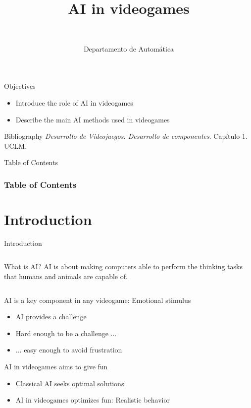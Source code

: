 \documentclass[10pt,compress]{beamer} %
\title[AI in videogames]{AI in videogames}
\author{\asignatura\\\carrera}
\institute{}
\date{Departamento de Automática}
\begin{document}
{\titlepageBlue
    \begin{frame}
        \titlepage
    \end{frame}
}

\begin{frame}[plain]{}
   \begin{block}{Objectives}
       \begin{itemize}
        \item Introduce the role of AI in videogames
        \item Describe the main AI methods used in videogames
       \end{itemize}
   \end{block}

   \begin{block}{Bibliography}
       \textit{Desarrollo de Videojuegos. Desarrollo de componentes}. Capítulo 1. UCLM.
   \end{block}
\end{frame}

{
\begin{frame}[shrink]{Table of Contents}
 \frametitle{Table of Contents}
 \tableofcontents
\end{frame}
}

\section{Introduction}

\begin{frame}{Introduction}
    \begin{columns}
	\vspace{-0.5cm}
		\vspace{-0.5cm}
		\begin{block}{What is AI?}
		AI is about making computers able to perform the thinking tasks that humans and animals are capable of.\\
		\end{block}
	\end{columns}
		\vspace{0.25cm}
	AI is a key component in any videogame: \alert{Emotional stimulus}
	\begin{itemize}
		\item AI provides a challenge
		\item Hard enough to be a challenge ...
		\item ... easy enough to avoid frustration
  	\end{itemize}
	AI in videogames aims to give fun
	\begin{itemize}
		\item Classical AI seeks optimal solutions
		\item AI in videogames optimizes fun: Realistic behavior
  	\end{itemize}
\end{frame}
\end{document}
